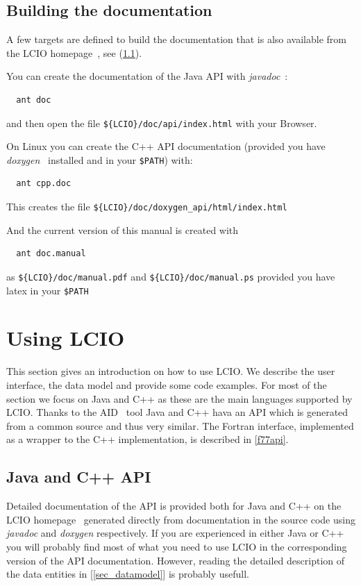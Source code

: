 \documentclass[twoside]{article}
\begin{document}
\subsection {Building the documentation} \label{build_doc}

A few targets are defined to build the documentation that is also available from the 
LCIO homepage~\cite{lcio_home}, see (\ref{sec_api}).

You can create the documentation of the Java API with {\em javadoc}~\cite{ref_javadoc}:
\begin{verbatim}
  ant doc 
\end{verbatim}
and then open the file \verb|${LCIO}/doc/api/index.html| with your Browser. %

\vspace{\baselineskip}
On Linux you can create the C++ API documentation (provided you have {\em doxygen}~\cite{ref_doxygen} 
installed and in your \verb|$PATH|) %
with:
\begin{verbatim}
  ant cpp.doc      
\end{verbatim}
This creates the file \verb|${LCIO}/doc/doxygen_api/html/index.html|   %

\vspace{\baselineskip}
And the current version of this manual is created with
\begin{verbatim}
  ant doc.manual
\end{verbatim}
as \verb|${LCIO}/doc/manual.pdf| and \verb|${LCIO}/doc/manual.ps| provided you have latex in your 
\verb|$PATH| %

\section{Using LCIO}
This section gives an introduction on how to use LCIO. We describe the user interface, the data model and
provide some code examples. For most of the section we focus on Java and C++ as these are the main 
languages supported by LCIO. Thanks to the AID~\cite{ref_aid} tool Java and C++ hava an API which is generated
from a common source and thus very similar.
The Fortran interface, implemented as a wrapper to the C++ implementation, is described 
in \ref{f77api}. 

\subsection{Java and C++ API} \label{sec_api}
Detailed documentation of the API is provided both for Java and C++ on the 
LCIO homepage~\cite{lcio_home} generated directly  from documentation in the source code using 
{\em javadoc} and {\em doxygen} respectively.   
If you are experienced in either Java or C++ you will probably  find most of what you need to use LCIO in the 
corresponding version of the API documentation. However, reading the detailed description of the data entities in 
[\ref{sec_datamodel}] is probably usefull.
 
\end{document}
